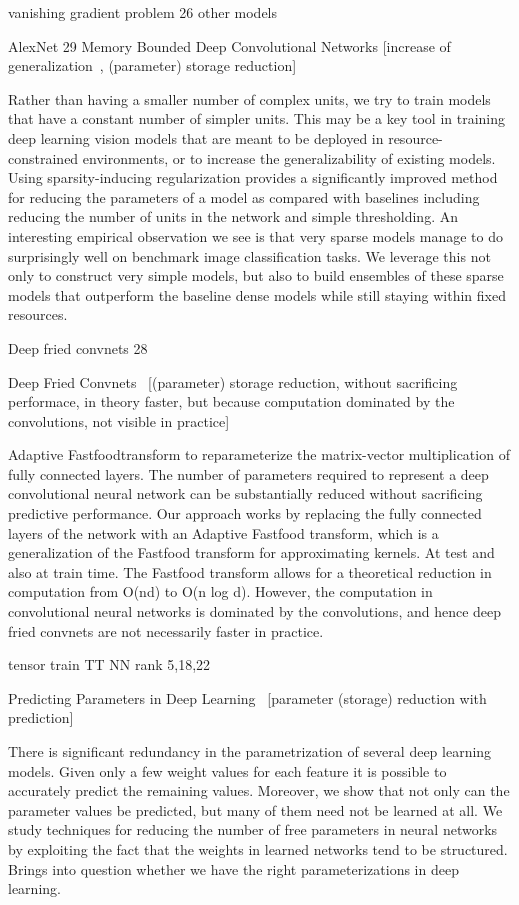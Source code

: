 \documentclass{article} %
\begin{document}
vanishing gradient problem 26
other models

AlexNet 29
Memory Bounded Deep Convolutional Networks [increase of generalization~\cite{collins2014memory}, (parameter) storage reduction]

Rather than having a smaller number of complex units, we try to train models that have a constant number of simpler units. This may be a key tool in training deep learning vision models that are meant to be deployed in resource-constrained environments, or to increase the generalizability of existing models. Using sparsity-inducing regularization provides a significantly improved method for reducing the parameters of a model as compared with baselines including reducing the number of units in the network and simple thresholding. An interesting empirical observation we see is that very sparse models manage to do surprisingly well on benchmark image classification tasks. We leverage this not only to construct very simple models, but also to build ensembles of these sparse models that outperform the baseline dense models while still staying within fixed resources.

Deep fried convnets 28

Deep Fried Convnets~\cite{yang2014deep} [(parameter) storage reduction, without sacrificing performace, in theory faster, but  because computation dominated by the convolutions, not visible in practice]

Adaptive Fastfoodtransform to reparameterize the matrix-vector multiplication of fully connected layers. The number of parameters required to represent a deep convolutional neural network can be substantially reduced without sacrificing predictive performance. Our approach works by replacing the fully connected layers of the network with an Adaptive Fastfood transform, which is a generalization of the Fastfood transform for approximating kernels. At test and also at train time. The Fastfood transform allows for a theoretical reduction in computation from O(nd) to O(n log d). However, the computation in convolutional neural networks is dominated by the convolutions, and hence deep fried convnets are not necessarily faster in practice.

tensor train TT NN
rank 5,18,22

Predicting Parameters in Deep Learning~\cite{denil2013predicting} [parameter (storage) reduction with prediction]

There is significant redundancy in the parametrization of several deep learning models. Given only a few weight values for each feature it is possible to accurately predict the remaining values. Moreover, we show that not only can the parameter values be predicted, but many of them need not be learned at all. We study techniques for reducing the number of free parameters in neural networks by exploiting the fact that the weights in learned networks tend to be structured. Brings into question whether we have the right parameterizations in deep learning.
\end{document}
